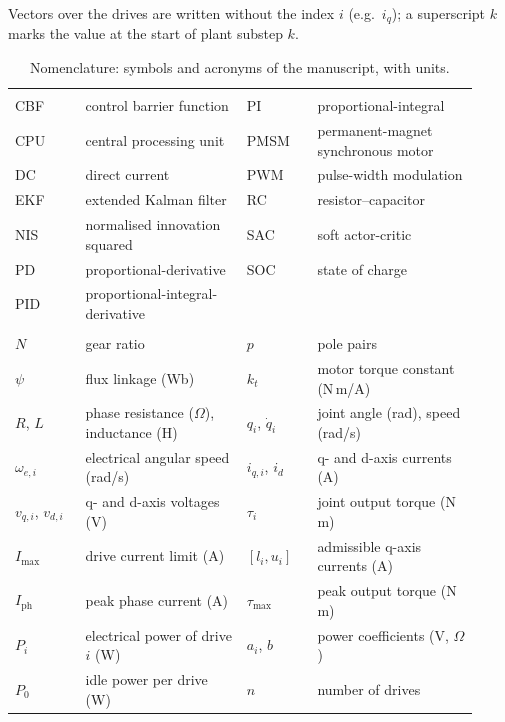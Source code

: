 Vectors over the drives are written without the index $i$ (e.g.\ $i_q$); a superscript $k$ marks the value at the start of plant substep $k$.

{\small\setlength{\tabcolsep}{4pt}\renewcommand{\arraystretch}{1.05}
\begin{longtable}{@{}>{\raggedright\arraybackslash}p{0.14\linewidth}>{\raggedright\arraybackslash}p{0.32\linewidth}>{\raggedright\arraybackslash}p{0.14\linewidth}>{\raggedright\arraybackslash}p{0.32\linewidth}@{}}
\caption{Nomenclature: symbols and acronyms of the manuscript, with units.}\label{tab:nomen}\\
\multicolumn{4}{@{}l}{\emph{Acronyms}}\\
CBF & control barrier function & PI & proportional-integral \\
CPU & central processing unit & PMSM & permanent-magnet synchronous motor \\
DC & direct current & PWM & pulse-width modulation \\
EKF & extended Kalman filter & RC & resistor--capacitor \\
NIS & normalised innovation squared & SAC & soft actor-critic \\
PD & proportional-derivative & SOC & state of charge \\
PID & proportional-integral-derivative & & \\[3pt]
\multicolumn{4}{@{}l}{\emph{Drives}}\\
$N$ & gear ratio & $p$ & pole pairs \\
$\psi$ & flux linkage (Wb) & $k_t$ & motor torque constant (N\,m/A) \\
$R$, $L$ & phase resistance ($\Omega$), inductance (H) & $q_i$, $\dot q_i$ & joint angle (rad), speed (rad/s) \\
$\omega_{e,i}$ & electrical angular speed (rad/s) & $i_{q,i}$, $i_d$ & q- and d-axis currents (A) \\
$v_{q,i}$, $v_{d,i}$ & q- and d-axis voltages (V) & $\tau_i$ & joint output torque (N\,m) \\
$I_{\max}$ & drive current limit (A) & $[l_i,u_i]$ & admissible q-axis currents (A) \\
$I_{\mathrm{ph}}$ & peak phase current (A) & $\tau_{\max}$ & peak output torque (N\,m) \\
$P_i$ & electrical power of drive $i$ (W) & $a_i$, $b$ & power coefficients (V, $\Omega$) \\
$P_0$ & idle power per drive (W) & $n$ & number of drives \\[3pt]

\end{longtable}}
